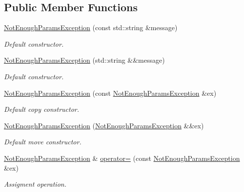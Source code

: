 \subsection*{Public Member Functions}
\begin{DoxyCompactItemize}
\item 
\hyperlink{class_dynamic_fast_buffers_1_1_not_enough_params_exception_a9f0ca4335fc6f6a8b4a97c1440206ba6}{Not\-Enough\-Params\-Exception} (const std\-::string \&message)
\begin{DoxyCompactList}\small\item\em Default constructor. \end{DoxyCompactList}\item 
\hyperlink{class_dynamic_fast_buffers_1_1_not_enough_params_exception_acd92e15d8e3959d6c659dccc612ec59c}{Not\-Enough\-Params\-Exception} (std\-::string \&\&message)
\begin{DoxyCompactList}\small\item\em Default constructor. \end{DoxyCompactList}\item 
\hyperlink{class_dynamic_fast_buffers_1_1_not_enough_params_exception_af3f82de9669a37752a48e5caba400e39}{Not\-Enough\-Params\-Exception} (const \hyperlink{class_dynamic_fast_buffers_1_1_not_enough_params_exception}{Not\-Enough\-Params\-Exception} \&ex)
\begin{DoxyCompactList}\small\item\em Default copy constructor. \end{DoxyCompactList}\item 
\hyperlink{class_dynamic_fast_buffers_1_1_not_enough_params_exception_a570292e3598ab32f1925e8231492afb9}{Not\-Enough\-Params\-Exception} (\hyperlink{class_dynamic_fast_buffers_1_1_not_enough_params_exception}{Not\-Enough\-Params\-Exception} \&\&ex)
\begin{DoxyCompactList}\small\item\em Default move constructor. \end{DoxyCompactList}\item 
\hyperlink{class_dynamic_fast_buffers_1_1_not_enough_params_exception}{Not\-Enough\-Params\-Exception} \& \hyperlink{class_dynamic_fast_buffers_1_1_not_enough_params_exception_aa7d6170a873e6abe2019033f8b34a242}{operator=} (const \hyperlink{class_dynamic_fast_buffers_1_1_not_enough_params_exception}{Not\-Enough\-Params\-Exception} \&ex)
\begin{DoxyCompactList}\small\item\em Assigment operation. \end{DoxyCompactList}\item 

\end{DoxyCompactItemize}
